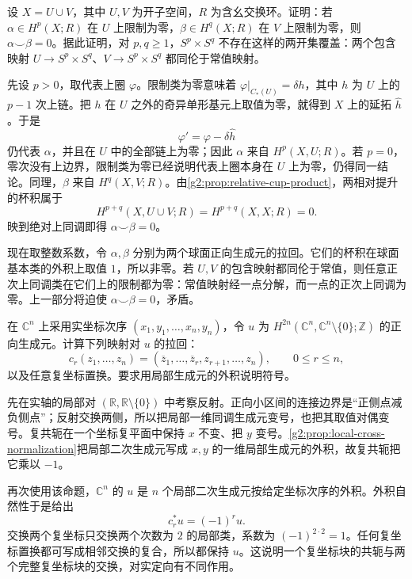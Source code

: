 \begin{exercise}\label{g2:ex:cup-obstruction-two-open-cover}
	设 \(X=U\cup V\)，其中 \(U,V\) 为开子空间，\(R\) 为含幺交换环。证明：若 \(\alpha\in H^p(X;R)\) 在 \(U\) 上限制为零，\(\beta\in H^q(X;R)\) 在 \(V\) 上限制为零，则 \(\alpha\smile\beta=0\)。据此证明，对 \(p,q\ge1\)，\(S^p\times S^q\) 不存在这样的两开集覆盖：两个包含映射 \(U\to S^p\times S^q\)、\(V\to S^p\times S^q\) 都同伦于常值映射。
\end{exercise}
\begin{solution}
	先设 \(p>0\)，取代表上圈 \(\varphi\)。限制类为零意味着 \(\varphi|_{C_*(U)}=\delta h\)，其中 \(h\) 为 \(U\) 上的 \(p-1\) 次上链。把 \(h\) 在 \(U\) 之外的奇异单形基元上取值为零，就得到 \(X\) 上的延拓 \(\widehat h\)。于是
	\[
		\varphi'=\varphi-\delta\widehat h
	\]
	仍代表 \(\alpha\)，并且在 \(U\) 中的全部链上为零；因此 \(\alpha\) 来自 \(H^p(X,U;R)\)。若 \(p=0\)，零次没有上边界，限制类为零已经说明代表上圈本身在 \(U\) 上为零，仍得同一结论。同理，\(\beta\) 来自 \(H^q(X,V;R)\)。由\cref{g2:prop:relative-cup-product}，两相对提升的杯积属于
	\[
		H^{p+q}(X,U\cup V;R)=H^{p+q}(X,X;R)=0.
	\]
	映到绝对上同调即得 \(\alpha\smile\beta=0\)。

	现在取整数系数，令 \(\alpha,\beta\) 分别为两个球面正向生成元的拉回。它们的杯积在球面基本类的外积上取值 \(1\)，所以非零。若 \(U,V\) 的包含映射都同伦于常值，则任意正次上同调类在它们上的限制都为零：常值映射经一点分解，而一点的正次上同调为零。上一部分将迫使 \(\alpha\smile\beta=0\)，矛盾。
\end{solution}

\begin{exercise}\label{g2:ex:complex-local-orientation}
	在 \(\mathbb C^n\) 上采用实坐标次序 \((x_1,y_1,\ldots,x_n,y_n)\)，令 \(u\) 为 \(H^{2n}(\mathbb C^n,\mathbb C^n\setminus\{0\};\mathbb Z)\) 的正向生成元。计算下列映射对 \(u\) 的拉回：
	\[
		c_r(z_1,\ldots,z_n)
		=(\overline z_1,\ldots,\overline z_r,z_{r+1},\ldots,z_n),
		\qquad 0\le r\le n,
	\]
	以及任意复坐标置换。要求用局部生成元的外积说明符号。
\end{exercise}
\begin{solution}
	先在实轴的局部对 \((\mathbb R,\mathbb R\setminus\{0\})\) 中考察反射。正向小区间的连接边界是“正侧点减负侧点”；反射交换两侧，所以把局部一维同调生成元变号，也把其取值对偶变号。复共轭在一个坐标复平面中保持 \(x\) 不变、把 \(y\) 变号。\cref{g2:prop:local-cross-normalization}把局部二次生成元写成 \(x,y\) 的一维局部生成元的外积，故复共轭把它乘以 \(-1\)。

	再次使用该命题，\(\mathbb C^n\) 的 \(u\) 是 \(n\) 个局部二次生成元按给定坐标次序的外积。外积自然性于是给出
	\[
		c_r^*u=(-1)^r u.
	\]
	交换两个复坐标只交换两个次数为 \(2\) 的局部类，系数为 \((-1)^{2\cdot2}=1\)。任何复坐标置换都可写成相邻交换的复合，所以都保持 \(u\)。这说明一个复坐标块的共轭与两个完整复坐标块的交换，对实定向有不同作用。
\end{solution}

